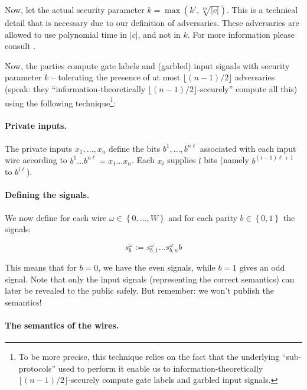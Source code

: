 Now, let the actual security parameter $k=\max(k',\sqrt[10]{|c|})$. This is a technical detail that is necessary due to our definition of adversaries. These adversaries are allowed to use polynomial time in $|c|$, and not in $k$. For more information please consult \cite{Rogaway:1991:RCS:888502}.


Now, the parties compute gate labels and (garbled) input signals with security parameter $k$ -- tolerating the presence of at most $\lfloor \left( n-1 \right) / 2\rfloor$ adversaries (speak: they ``information-theoretically $\lfloor (n-1)/2 \rfloor$-securely'' compute all this) using the following technique\footnote{To be more precise, this technique relies on the fact that the underlying ``sub-protocols'' used to perform it enable us to information-theoretically $\lfloor (n-1)/2 \rfloor$-securely compute gate labels and garbled input signals.}:

\paragraph{Private inputs.}

The private inputs $x_1,\dots,x_n$ define the bits $b^1,\dots,b^{n\ell}$ associated with each input wire according to $b^1\dots b^{n\ell}=x_1\dots x_n$. Each $x_i$ supplies $l$ bits (namely $b^{(i-1)\ell+1}$ to $b^{i\ell}$).

\paragraph{Defining the signals.}

We now define for each wire $\omega\in\left\{ 0,\dots,W \right\}$ and for each parity $b\in\left\{ 0,1 \right\}$ the signals:

\begin{equation}
  \label{eq:definition-of-signals}
  s_b^\omega:=s_{b,1}^\omega\dots s_{b,n}^\omega b
\end{equation}

This means that for $b=0$, we have the even signals, while $b=1$ gives an odd signal. Note that only the input signals (representing the correct semantics) can later be revealed to the public safely. But remember: we won't publish the semantics!

\paragraph{The semantics of the wires.}

